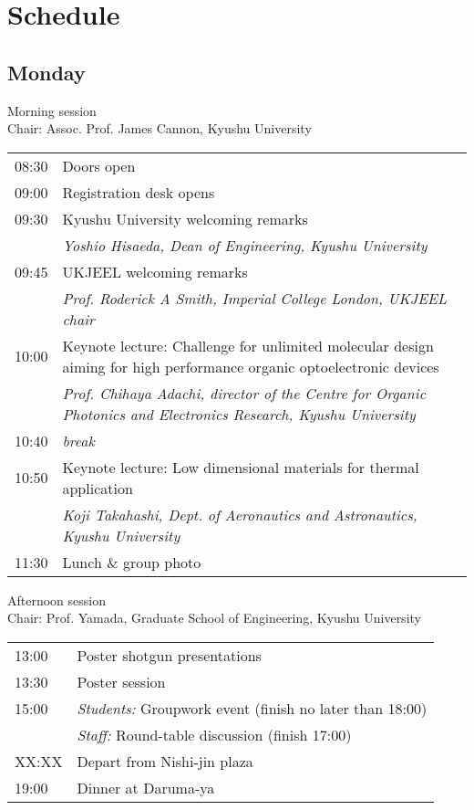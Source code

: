 \section{Schedule}

\subsection*{Monday}

Morning session \\
Chair: Assoc. Prof. James Cannon, Kyushu University

\noindent\begin{tabular}{|l|l|}
    \hline
    08:30   & Doors open \\
    09:00   & Registration desk opens \\
    09:30   & Kyushu University welcoming remarks \\
            & \emph{Yoshio Hisaeda, Dean of Engineering, Kyushu University} \\
    09:45   & UKJEEL welcoming remarks \\
            & \emph{Prof. Roderick A Smith, Imperial College London, UKJEEL chair} \\
    10:00   & Keynote lecture: Challenge for unlimited molecular design aiming for high performance organic optoelectronic devices \\
            & \emph{Prof. Chihaya Adachi, director of the Centre for Organic Photonics and Electronics Research, Kyushu University} \\
    10:40   & \emph{break} \\
    10:50   & Keynote lecture: Low dimensional materials for thermal application \\
            & \emph{Koji Takahashi, Dept. of Aeronautics and Astronautics, Kyushu University} \\
    11:30   & Lunch \& group photo \\
    \hline
\end{tabular}

\vspace{2em}
\noindent Afternoon session \\
Chair: Prof. Yamada, Graduate School of Engineering, Kyushu University

\noindent\begin{tabular}{|l|l|}
    \hline
    13:00   & Poster shotgun presentations \\
    13:30   & Poster session \\
    15:00   & \emph{Students:} Groupwork event (finish no later than 18:00) \\ %
            & \emph{Staff:} Round-table discussion (finish 17:00)\\
    XX:XX   & Depart from Nishi-jin plaza \\
    19:00   & Dinner at Daruma-ya \\
    \hline
\end{tabular}

